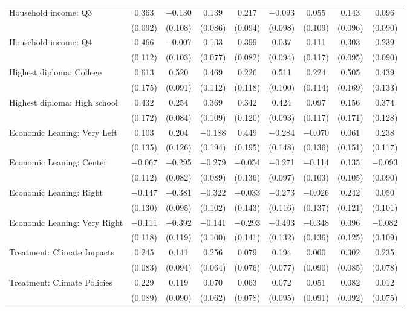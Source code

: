 \begin{tabular}{@{\extracolsep{5pt}}lcccccccc}
  Household income: Q3 & 0.363 & $-$0.130 & 0.139 & 0.217 & $-$0.093 & 0.055 & 0.143 & 0.096 \\ 
  & (0.092) & (0.108) & (0.086) & (0.094) & (0.098) & (0.109) & (0.096) & (0.090) \\ 
  Household income: Q4 & 0.466 & $-$0.007 & 0.133 & 0.399 & 0.037 & 0.111 & 0.303 & 0.239 \\ 
  & (0.112) & (0.103) & (0.077) & (0.082) & (0.094) & (0.117) & (0.095) & (0.090) \\ 
  Highest diploma: College & 0.613 & 0.520 & 0.469 & 0.226 & 0.511 & 0.224 & 0.505 & 0.439 \\ 
  & (0.175) & (0.091) & (0.112) & (0.118) & (0.100) & (0.114) & (0.169) & (0.133) \\ 
  Highest diploma: High school & 0.432 & 0.254 & 0.369 & 0.342 & 0.424 & 0.097 & 0.156 & 0.374 \\ 
  & (0.172) & (0.084) & (0.109) & (0.120) & (0.093) & (0.117) & (0.171) & (0.128) \\ 
  Economic Leaning: Very Left & 0.103 & 0.204 & $-$0.188 & 0.449 & $-$0.284 & $-$0.070 & 0.061 & 0.238 \\ 
  & (0.135) & (0.126) & (0.194) & (0.195) & (0.148) & (0.136) & (0.151) & (0.117) \\ 
  Economic Leaning: Center & $-$0.067 & $-$0.295 & $-$0.279 & $-$0.054 & $-$0.271 & $-$0.114 & 0.135 & $-$0.093 \\ 
  & (0.112) & (0.082) & (0.089) & (0.136) & (0.097) & (0.103) & (0.105) & (0.090) \\ 
  Economic Leaning: Right & $-$0.147 & $-$0.381 & $-$0.322 & $-$0.033 & $-$0.273 & $-$0.026 & 0.242 & 0.050 \\ 
  & (0.130) & (0.095) & (0.102) & (0.143) & (0.116) & (0.137) & (0.121) & (0.101) \\ 
  Economic Leaning: Very Right & $-$0.111 & $-$0.392 & $-$0.141 & $-$0.293 & $-$0.493 & $-$0.348 & 0.096 & $-$0.082 \\ 
  & (0.118) & (0.119) & (0.100) & (0.141) & (0.132) & (0.136) & (0.125) & (0.109) \\ 
  Treatment: Climate Impacts & 0.245 & 0.141 & 0.256 & 0.079 & 0.194 & 0.060 & 0.302 & 0.235 \\ 
  & (0.083) & (0.094) & (0.064) & (0.076) & (0.077) & (0.090) & (0.085) & (0.078) \\ 
  Treatment: Climate Policies & 0.229 & 0.119 & 0.070 & 0.063 & 0.072 & 0.051 & 0.082 & 0.012 \\ 
  & (0.089) & (0.090) & (0.062) & (0.078) & (0.095) & (0.091) & (0.092) & (0.075) \\ 

\end{tabular}
